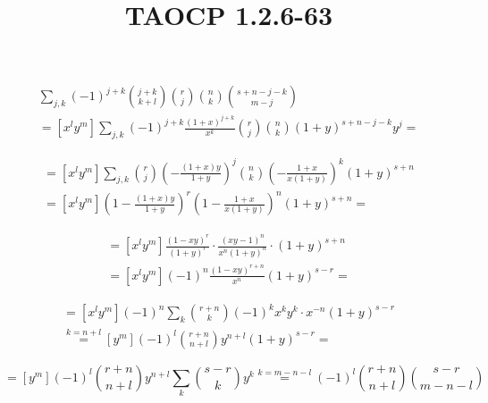 \documentclass{article}
\title{TAOCP 1.2.6\mbox{-}63}
\begin{document}
\maketitle

\begin{multline*}
\sum_{j,k} {(-1)}^{j+k} \binom{j+k}{k+l}\binom{r}{j}\binom{n}{k}\binom{s+n-j-k}{m-j} \\
= [x^{l}y^{m}] \sum_{j,k} {(-1)}^{j+k} \frac{{(1+x)}^{j+k}}{x^{k}} \binom{r}{j}\binom{n}{k} {(1+y)}^{s+n-j-k}y^{j} =
\end{multline*}

\begin{multline*}
= [x^{l}y^{m}] \sum_{j,k} \binom{r}{j} {(-\frac{(1+x)y}{1+y})}^{j} \binom{n}{k} {(-\frac{1+x}{x(1+y)})}^{k} {(1+y)}^{s+n} \\
= [x^{l}y^{m}]{(1-\frac{(1+x)y}{1+y})}^{r}{(1-\frac{1+x}{x(1+y)})}^{n}{(1+y)}^{s+n} =
\end{multline*}

\begin{multline*}
= [x^{l}y^{m}] \frac{{(1-xy)}^{r}}{{(1+y)}^{r}} \cdot \frac{{(xy-1)}^{n}}{x^{n}{(1+y)}^{n}} \cdot {(1+y)}^{s+n} \\
= [x^{l}y^{m}] {(-1)}^{n} \frac{{(1-xy)}^{r+n}}{x^{n}}{(1+y)}^{s-r} =
\end{multline*}

\begin{multline*}
= [x^{l}y^{m}] {(-1)}^{n} \sum_{k} \binom{r+n}{k} {(-1)}^{k}x^{k}y^{k} \cdot x^{-n}{(1+y)}^{s-r} \\
\overset{k = n + l}{=} [y^{m}] {(-1)}^{l} \binom{r+n}{n+l}y^{n+l}{(1+y)}^{s-r} =
\end{multline*}

\[ = [y^{m}] {(-1)}^{l} \binom{r+n}{n+l}y^{n+l} \sum_{k} \binom{s-r}{k}y^{k} \overset{k = m-n-l}{=} {(-1)}^{l} \binom{r+n}{n+l}\binom{s-r}{m-n-l} \]
\end{document}
